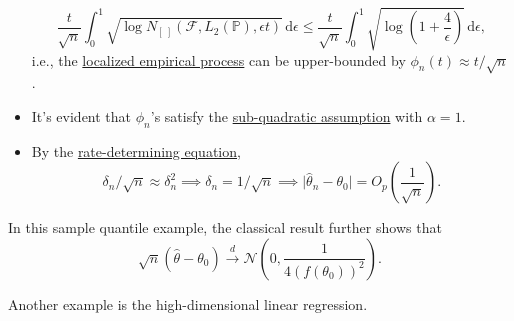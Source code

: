 \begin{explanation}
\begin{itemize}
		      \[
			      \frac{t}{\sqrt{n} } \int_{0}^{1} \sqrt{\log N_{[\ ]}(\mathscr{F} , L_2(\mathbb{P} ), \epsilon t)}  \,\mathrm{d}\epsilon
			      \leq \frac{t}{\sqrt{n} } \int_{0}^{1} \sqrt{\log \left( 1 + \frac{4}{\epsilon } \right) } \,\mathrm{d}\epsilon ,
		      \]
		      i.e., the \hyperref[def:localized-EP]{localized empirical process} can be upper-bounded by \(\phi _n(t) \approx t / \sqrt{n} \).
		\item It's evident that \(\phi _n\)'s satisfy the \hyperref[def:sub-quadratic-assumption]{sub-quadratic assumption} with \(\alpha = 1\).
		\item By the \hyperref[def:rate-determining-equation]{rate-determining equation},
		      \[
			      \delta _n / \sqrt{n} \approx \delta _n^2
			      \implies \delta _n = 1 / \sqrt{n}
			      \implies \vert \hat{\theta} _n - \theta _0 \vert = O_p \left( \frac{1}{\sqrt{n} } \right) .
		      \]
	\end{itemize}
\end{explanation}

\begin{remark}
	In this sample quantile example, the classical result further shows that
	\[
		\sqrt{n} (\hat{\theta} - \theta _0) \overset{d}{\to } \mathcal{N} \left( 0, \frac{1}{4 ( f(\theta _0) )^2} \right).
	\]
\end{remark}

Another example is the high-dimensional linear regression.

